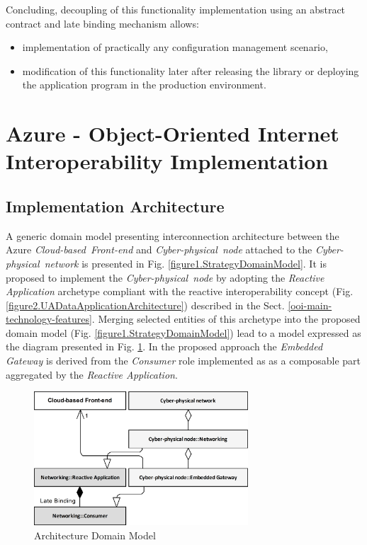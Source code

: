 \documentclass{article}
\begin{document}
Concluding, decoupling of this functionality implementation using an abstract contract and late binding mechanism allows:

\begin{itemize}
      \item implementation of practically any configuration management scenario,
      \item modification of this functionality later after releasing the library or deploying the application program in the production environment.
\end{itemize}

\section{Azure - Object-Oriented Internet Interoperability Implementation}\label{sect.gateway-implementation}

\subsection{Implementation Architecture}\label{subsection.GatewayImplementationArchitecture}

A generic domain model presenting interconnection architecture between the Azure \textit{Cloud-based\ Front-end} and \textit{Cyber-physical\ node} attached to the \textit{Cyber-physical\ network} is presented in Fig. \ref*{figure1.StrategyDomainModel}. It is proposed to implement the \textit{Cyber-physical\ node} by adopting the \textit{Reactive Application} archetype compliant with the reactive interoperability concept (Fig. \ref*{figure2.UADataApplicationArchitecture}) described in the Sect. \ref*{ooi-main-technology-features}. Merging selected entities of this archetype into the proposed domain model (Fig. \ref*{figure1.StrategyDomainModel}) lead to a model expressed as the diagram presented in Fig. \ref*{figure3.ImplementationDomainModel}. In the proposed approach the \textit{Embedded Gateway} is derived from the \textit{Consumer} role implemented as as a composable part aggregated by the \textit{Reactive Application}.

\begin{figure}
      \centering
      \includegraphics[width=8cm]{../.Media/ImplementationDomainModel.png}
      \caption{Architecture Domain Model}\label{figure3.ImplementationDomainModel}
\end{figure}
\end{document}
